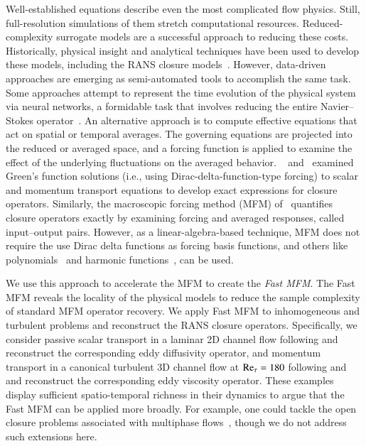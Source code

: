 Well-established equations describe even the most complicated flow physics.
Still, full-resolution simulations of them stretch computational resources. 
Reduced-complexity surrogate models are a successful approach to reducing these costs.
Historically, physical insight and analytical techniques have been used to develop these models, including the RANS closure models~\citep{tennekes1972first}.
However, data-driven approaches are emerging as semi-automated tools to accomplish the same task.
Some approaches attempt to represent the time evolution of the physical system via neural networks, a formidable task that involves reducing the entire Navier--Stokes operator~\citep{li2020fourier,lu2021learning}.
An alternative approach is to compute effective equations that act on spatial or temporal averages. 
The governing equations are projected into the reduced or averaged space, and a forcing function is applied to examine the effect of the underlying fluctuations on the averaged behavior. 
~\citet{kraichnan1987eddy} and~\citet{hamba1995analysis} examined Green's function solutions (i.e., using Dirac-delta-function-type forcing) to scalar and momentum transport equations to develop exact expressions for closure operators. 
Similarly, the macroscopic forcing method (MFM) of~\citet{maniMacroscopicForcingMethod2021} quantifies closure operators exactly by examining forcing and averaged responses, called input--output pairs. 
However, as a linear-algebra-based technique, MFM does not require the use Dirac delta functions as forcing basis functions, and others like polynomials~\citep{liu21} and harmonic functions~\citep{shirian22}, can be used. 

We use this approach to accelerate the MFM to create the \textit{Fast MFM}. 
The Fast MFM reveals the locality of the physical models to reduce the sample complexity of standard MFM operator recovery.
We apply Fast MFM to inhomogeneous and turbulent problems and reconstruct the RANS closure operators. 
Specifically, we consider passive scalar transport in a laminar 2D channel flow following \citet{maniMacroscopicForcingMethod2021} and reconstruct the corresponding eddy diffusivity operator, and momentum transport in a canonical turbulent 3D channel flow at $\mbox{\text{Re}}_\tau = 180$ following \citet{hamba2005nonlocal} and \citet{park21} and reconstruct the corresponding eddy viscosity operator.
These examples display sufficient spatio-temporal richness in their dynamics to argue that the Fast MFM can be applied more broadly. 
For example, one could tackle the open closure problems associated with multiphase flows~\citep{bryngelson19,bryngelson19_ML,vie2016particle,ma2016using}, though we do not address such extensions here.

